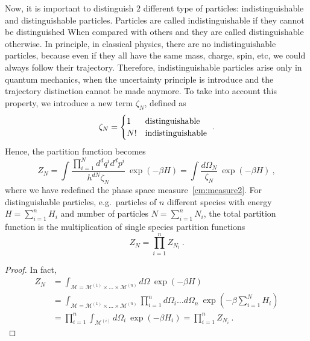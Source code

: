     Now, it is important to distinguish $2$ different type of particles: indistinguishable and distinguishable particles. Particles are called indistinguishable if they cannot be distinguished When compared with others and they are called distinguishable otherwise. In principle, in classical physics, there are no indistinguishable particles, because even if they all have the same mass, charge, spin, etc, we could always follow their trajectory. Therefore, indistinguishable particles arise only in quantum mechanics, when the uncertainty principle is introduce and the trajectory distinction cannot be made anymore. To take into account this property, we introduce a new term $\zeta_N$, defined as 
    \begin{equation}\label{cm:dist}
        \zeta_N = \begin{cases}
            1 & \textnormal{distinguishable} \\
            N! & \textnormal{indistinguishable}
        \end{cases} ~.
    \end{equation}
    Hence, the partition function becomes
    \begin{equation*}
        Z_N = \int \frac{\prod_{i=1}^N d^d q^i d^d p^i}{h^{dN} \zeta_N} ~ \exp (- \beta H) = \int \frac{d\Omega_N}{\zeta_N} ~ \exp (- \beta H) ~,
    \end{equation*}
    where we have redefined the phase space measure~\eqref{cm:measure2}. 
    For distinguishable particles, e.g.~particles of $n$ different species with energy $H = \sum_{i = 1}^{n} H_i$ and number of particles $N = \sum_{i=1}^n N_i$, the total partition function is the multiplication of single species partition functions
    \begin{equation*}
        Z_N = \prod_{i = 1}^{n} Z_{N_i} ~.
    \end{equation*}
    \begin{proof}
        In fact, 
        \begin{equation*}
        \begin{aligned}
            Z_N & = \int_{\mathcal M = \mathcal M^{(1)}\times \ldots \times \mathcal M^{(n)}} d\Omega ~\exp (-\beta H) \\ & = \int_{\mathcal M = \mathcal M^{(1)}\times \ldots \times \mathcal M^{(n)}} \prod_{i = 1}^{n} d\Omega_i \ldots d\Omega_n ~ \exp(-\beta \sum_{i = 1}^{N} H_i) \\ & = \prod_{i = 1}^{n} \int_{\mathcal M^{(i)}} d\Omega_i ~ \exp(- \beta H_i) = \prod_{i = 1}^{n} Z_{N_i} ~.
        \end{aligned}
        \end{equation*}
    \end{proof}
